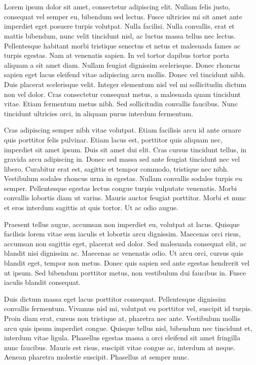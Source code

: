 \chapter{}
Lorem ipsum dolor sit amet, consectetur adipiscing elit. Nullam felis justo, consequat vel semper eu, bibendum sed lectus. Fusce ultricies mi sit amet ante imperdiet eget posuere turpis volutpat. Nulla facilisi. Nulla convallis, erat et mattis bibendum, nunc velit tincidunt nisl, ac luctus massa tellus nec lectus. Pellentesque habitant morbi tristique senectus et netus et malesuada fames ac turpis egestas. Nam at venenatis sapien. In vel tortor dapibus tortor porta aliquam a sit amet diam. Nullam feugiat dignissim scelerisque. Donec rhoncus sapien eget lacus eleifend vitae adipiscing arcu mollis. Donec vel tincidunt nibh. Duis placerat scelerisque velit. Integer elementum nisl vel mi sollicitudin dictum non vel dolor. Cras consectetur consequat metus, a malesuada quam tincidunt vitae. Etiam fermentum metus nibh. Sed sollicitudin convallis faucibus. Nunc tincidunt ultricies orci, in aliquam purus interdum fermentum.

Cras adipiscing semper nibh vitae volutpat. Etiam facilisis arcu id ante ornare quis porttitor felis pulvinar. Etiam lacus est, porttitor quis aliquam nec, imperdiet sit amet ipsum. Duis sit amet dui elit. Cras cursus tincidunt tellus, in gravida arcu adipiscing in. Donec sed massa sed ante feugiat tincidunt nec vel libero. Curabitur erat est, sagittis et tempor commodo, tristique nec nibh. Vestibulum sodales rhoncus urna in egestas. Nullam convallis sodales turpis eu semper. Pellentesque egestas lectus congue turpis vulputate venenatis. Morbi convallis lobortis diam ut varius. Mauris auctor feugiat porttitor. Morbi et nunc et eros interdum sagittis at quis tortor. Ut ac odio augue.

Praesent tellus augue, accumsan non imperdiet eu, volutpat at lacus. Quisque facilisis lorem vitae sem iaculis et lobortis arcu dignissim. Maecenas orci risus, accumsan non sagittis eget, placerat sed dolor. Sed malesuada consequat elit, ac blandit nisi dignissim ac. Maecenas ac venenatis odio. Ut arcu orci, cursus quis blandit eget, tempor non metus. Donec quis sapien sed ante egestas hendrerit vel ut ipsum. Sed bibendum porttitor metus, non vestibulum dui faucibus in. Fusce iaculis blandit consequat.

Duis dictum massa eget lacus porttitor consequat. Pellentesque dignissim convallis fermentum. Vivamus nisl mi, volutpat eu porttitor vel, suscipit id turpis. Proin diam erat, cursus non tristique at, pharetra nec ante. Vestibulum mollis arcu quis ipsum imperdiet congue. Quisque tellus nisl, bibendum nec tincidunt et, interdum vitae ligula. Phasellus egestas massa a orci eleifend sit amet fringilla nunc faucibus. Mauris est risus, suscipit vitae congue ac, interdum at neque. Aenean pharetra molestie suscipit. Phasellus at semper nunc.

